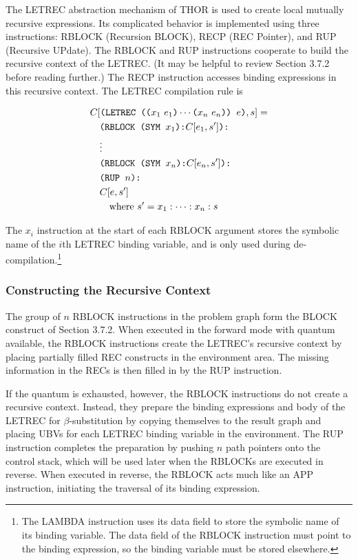 The LETREC abstraction mechanism of THOR is used to create local mutually recursive
expressions. Its complicated behavior is implemented using three instructions: RBLOCK
(Recursion BLOCK), RECP (REC Pointer), and RUP (Recursive UPdate). The RBLOCK and RUP
instructions cooperate to build the recursive context of the LETREC. (It may be helpful to
review Section 3.7.2 before reading further.) The RECP instruction accesses binding
expressions in this recursive context. The LETREC compilation rule is

\[
\begin{aligned}
&C[\texttt{(LETREC ((}x_1\ e_1\texttt{)}\cdots\texttt{(}x_n\ e_n\texttt{)) }e\texttt{)}, s] =\\
&\quad
  \texttt{(RBLOCK (SYM }x_1\texttt{):}C[e_1,s']\texttt{):}\\
&\quad \vdots\\
&\quad \texttt{(RBLOCK (SYM }x_n\texttt{):}C[e_n,s']\texttt{):}\\
&\quad \texttt{(RUP }n\texttt{):}\\
&\quad C[e,s']\\
&\qquad\text{where }s' = x_1:\cdots:x_n:s
\end{aligned}
\]

The \(x_i\)\THOR{)} instruction at the start
of each RBLOCK argument stores the symbolic name of the \(i\)th LETREC binding variable,
and is only used during de-compilation.\footnote{The LAMBDA instruction uses its data
field to store the symbolic name of its binding variable. The data field of the RBLOCK
instruction must point to the binding expression, so the binding variable must be stored
elsewhere.}


\subsubsection*{Constructing the Recursive Context}
The group of \(n\) RBLOCK instructions in the problem graph form the BLOCK construct of
Section 3.7.2. When executed in the forward mode with quantum available, the RBLOCK
instructions create the LETREC's recursive context by placing partially filled REC
constructs in the environment area. The missing information in the RECs is then filled in
by the RUP instruction.

If the quantum is exhausted, however, the RBLOCK instructions do not create a recursive
context. Instead, they prepare the binding expressions and body of the LETREC for
\(\beta\)-substitution by copying themselves to the result graph and placing UBVs for each
LETREC binding variable in the environment. The RUP instruction completes the preparation
by pushing \(n\) path pointers onto the control stack, which will be used later when the
RBLOCKs are executed in reverse. When executed in reverse, the RBLOCK acts much like an
APP instruction, initiating the traversal of its binding expression.

